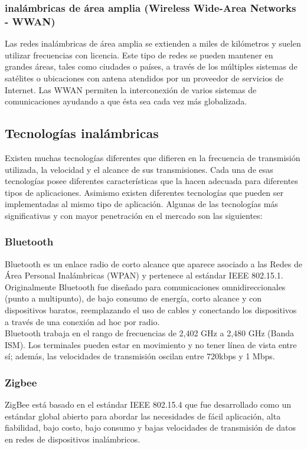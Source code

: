 	\subsubsection{\textbf{inalámbricas de área amplia (Wireless Wide-Area Networks - WWAN)}}
	Las redes inalámbricas de área amplia se extienden a miles de kilómetros y suelen utilizar frecuencias con licencia. Este tipo de redes se pueden mantener en grandes áreas, tales como ciudades o países, a través de los múltiples sistemas de satélites o ubicaciones con antena atendidos por un proveedor de servicios de Internet. Las WWAN permiten la interconexión de varios sistemas de comunicaciones ayudando a que ésta sea cada vez más globalizada.

	\subsection{Tecnologías inalámbricas}
	Existen muchas tecnologías diferentes que difieren en la frecuencia de transmisión utilizada, la velocidad y el alcance de sus transmisiones. Cada una de esas tecnologías posee diferentes características que la hacen adecuada para diferentes tipos de aplicaciones. Asimismo existen diferentes tecnologías que pueden ser implementadas al mismo tipo de aplicación. Algunas de las tecnologías más significativas y con mayor penetración en el mercado son las siguientes:
	
	\subsubsection{Bluetooth}
	Bluetooth es un enlace radio de corto alcance que aparece asociado a las Redes de Área Personal Inalámbricas (WPAN) y pertenece al estándar IEEE 802.15.1. Originalmente Bluetooth fue diseñado para comunicaciones omnidireccionales (punto a multipunto), de bajo consumo de energía, corto alcance y con dispositivos baratos, reemplazando el uso de cables y conectando los dispositivos a través de una conexión ad hoc por radio. \\
		
	Bluetooth trabaja en el rango de frecuencias de 2,402 GHz a 2,480 GHz (Banda ISM). Los terminales pueden estar en movimiento y no tener línea de vista entre sí; además, las velocidades de transmisión oscilan entre 720kbps y 1 Mbps. 
	
	\subsubsection{Zigbee}
	ZigBee está basado en el estándar IEEE 802.15.4 que fue desarrollado como un estándar global abierto para abordar las necesidades de fácil aplicación, alta fiabilidad, bajo costo, bajo consumo y bajas velocidades de transmisión de datos en redes de dispositivos inalámbricos.\\
		
